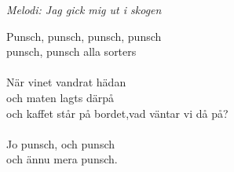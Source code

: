 {\footnotesize\textit{Melodi: Jag gick mig ut i skogen}}\par
\vspace{10pt}
\revrpt Punsch, punsch, punsch, punsch\\
punsch, punsch alla sorters\rpt\\
\\
När vinet vandrat hädan\\
och maten lagts därpå\\
och kaffet står på bordet,vad väntar vi då på?\\
\\
\revrpt Jo punsch, och punsch\\
och ännu mera punsch.\rpt
